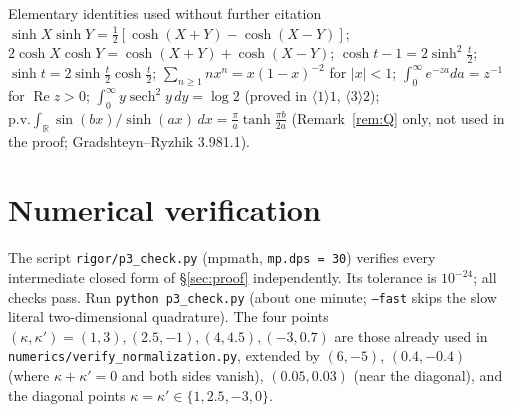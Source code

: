 \documentclass[11pt]{article}
\begin{document}
\begin{citedbox}{Elementary identities used without further citation}
\(\sinh X\sinh Y=\frac12[\cosh(X+Y)-\cosh(X-Y)]\);
\(2\cosh X\cosh Y=\cosh(X+Y)+\cosh(X-Y)\);
\(\cosh t-1=2\sinh^2\frac t2\); \(\sinh t=2\sinh\frac t2\cosh\frac t2\);
\(\sum_{n\ge1}nx^n=x(1-x)^{-2}\) for \(|x|<1\);
\(\int_0^\infty e^{-za}da=z^{-1}\) for \(\operatorname{Re}z>0\);
\(\int_0^\infty y\operatorname{sech}^2y\,dy=\log2\) (proved in \(\langle1\rangle1\),
\(\langle3\rangle2\));
\(\mathrm{p.v.}\int_{\mathbb R}\sin(bx)/\sinh(ax)\,dx=\frac\pi a\tanh\frac{\pi b}{2a}\)
(Remark~\ref{rem:Q} only, not used in the proof; Gradshteyn--Ryzhik 3.981.1).
\end{citedbox}

\section{Numerical verification}\label{sec:numerics}

The script \texttt{rigor/p3\_check.py} (mpmath, \texttt{mp.dps = 30}) verifies every intermediate
closed form of \S\ref{sec:proof} independently.  Its tolerance is \(10^{-24}\); all checks pass.
Run \texttt{python p3\_check.py} (about one minute; \texttt{--fast} skips the slow literal
two-dimensional quadrature).  The four points \((\kappa,\kappa')=(1,3),(2.5,-1),(4,4.5),(-3,0.7)\)
are those already used in \texttt{numerics/verify\_normalization.py}, extended by \((6,-5)\),
\((0.4,-0.4)\) (where \(\kappa+\kappa'=0\) and both sides vanish), \((0.05,0.03)\) (near the
diagonal), and the diagonal points \(\kappa=\kappa'\in\{1,2.5,-3,0\}\).
\end{document}
